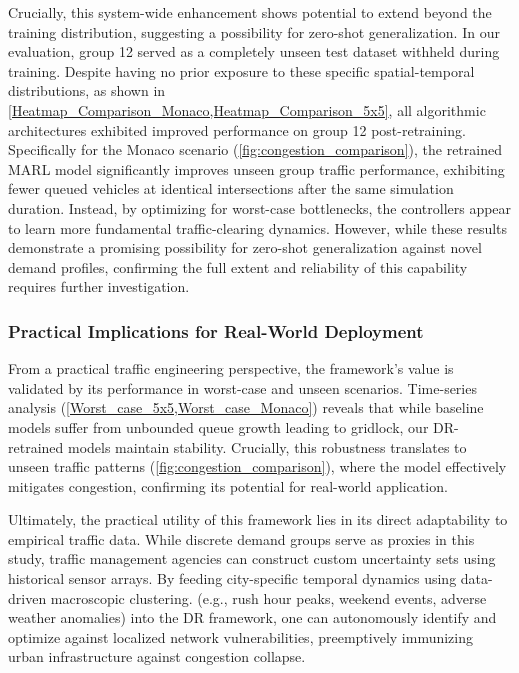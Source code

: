\documentclass[lettersize,journal]{IEEEtran}
\begin{document}
Crucially, this system-wide enhancement shows potential to extend beyond the training distribution, suggesting a possibility for zero-shot generalization. In our evaluation, group 12 served as a completely unseen test dataset withheld during training. Despite having no prior exposure to these specific spatial-temporal distributions, as shown in \cref{Heatmap_Comparison_Monaco,Heatmap_Comparison_5x5}, all algorithmic architectures exhibited improved performance on group 12 post-retraining. Specifically for the Monaco scenario (\cref{fig:congestion_comparison}), the retrained MARL model significantly improves unseen group traffic performance, exhibiting fewer queued vehicles at identical intersections after the same simulation duration. Instead, by optimizing for worst-case bottlenecks, the controllers appear to learn more fundamental traffic-clearing dynamics. However, while these results demonstrate a promising possibility for zero-shot generalization against novel demand profiles, confirming the full extent and reliability of this capability requires further investigation.

\subsubsection{Practical Implications for Real-World Deployment}

From a practical traffic engineering perspective, the framework's value is validated by its performance in worst-case and unseen scenarios. Time-series analysis (\cref{Worst_case_5x5,Worst_case_Monaco}) reveals that while baseline models suffer from unbounded queue growth leading to gridlock, our DR-retrained models maintain stability. Crucially, this robustness translates to unseen traffic patterns (\cref{fig:congestion_comparison}), where the model effectively mitigates congestion, confirming its potential for real-world application.

Ultimately, the practical utility of this framework lies in its direct adaptability to empirical traffic data. While discrete demand groups serve as proxies in this study, traffic management agencies can construct custom uncertainty sets using historical sensor arrays. By feeding city-specific temporal dynamics using data-driven macroscopic clustering. (e.g., rush hour peaks, weekend events, adverse weather anomalies) into the DR framework, one can autonomously identify and optimize against localized network vulnerabilities, preemptively immunizing urban infrastructure against congestion collapse.
\end{document}

